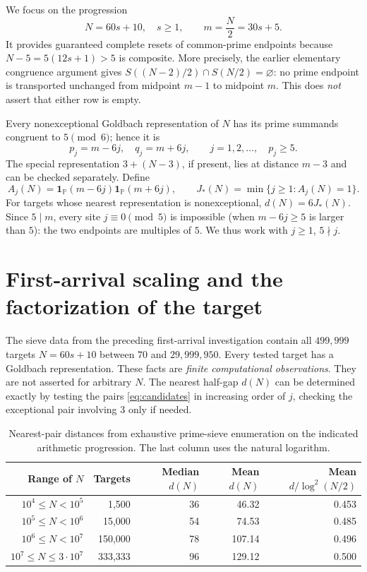 \documentclass[11pt,a4paper]{article}
\theoremstyle{definition}
\newcommand{\PP}{\mathbb P}
\newcommand{\ind}{\mathbf 1}
\begin{document}
We focus on the progression
\begin{equation}\label{eq:progression}
 N=60s+10,\quad s\ge1,\qquad m=\frac N2=30s+5.
\end{equation}
It provides guaranteed complete resets of common-prime endpoints because $N-5=5(12s+1)>5$ is composite.  More precisely, the earlier elementary congruence argument gives $S((N-2)/2)\cap S(N/2)=\varnothing$: no prime endpoint is transported unchanged from midpoint $m-1$ to midpoint $m$.  This does \emph{not} assert that either row is empty.

Every nonexceptional Goldbach representation of $N$ has its prime summands congruent to $5\pmod6$; hence it is
\begin{equation}\label{eq:candidates}
 p_j=m-6j,\quad q_j=m+6j,\qquad j=1,2,\ldots,\quad p_j\ge5.
\end{equation}
The special representation $3+(N-3)$, if present, lies at distance $m-3$ and can be checked separately.  Define
\begin{equation}\label{eq:Aj}
 A_j(N)=\ind_{\PP}(m-6j)\ind_{\PP}(m+6j),\qquad
 J_*(N)=\min\{j\ge1:A_j(N)=1\}.
\end{equation}
For targets whose nearest representation is nonexceptional, $d(N)=6J_*(N)$.  Since $5\mid m$, every site $j\equiv0\pmod5$ is impossible (when $m-6j\ge5$ is larger than $5$): the two endpoints are multiples of $5$.  We thus work with $j\ge1$, $5\nmid j$.

\section{First-arrival scaling and the factorization of the target}
The sieve data from the preceding first-arrival investigation contain all $499{,}999$ targets $N=60s+10$ between $70$ and $29{,}999{,}950$.  Every tested target has a Goldbach representation.  These facts are \emph{finite computational observations}. They are not asserted for arbitrary $N$.  The nearest half-gap $d(N)$ can be determined exactly by testing the pairs \eqref{eq:candidates} in increasing order of $j$, checking the exceptional pair involving $3$ only if needed.

\begin{table}[ht]
\centering\small
\begin{tabular}{@{}rrrrr@{}}
\toprule
Range of $N$ & Targets & Median $d(N)$ & Mean $d(N)$ & Mean $d/\log^2(N/2)$\\
\midrule
$10^4\le N<10^5$ & 1,500 & 36 & 46.32 & 0.453\\
$10^5\le N<10^6$ & 15,000 & 54 & 74.53 & 0.485\\
$10^6\le N<10^7$ & 150,000 & 78 & 107.14 & 0.496\\
$10^7\le N\le3\cdot10^7$ & 333,333 & 96 & 129.12 & 0.500\\
\bottomrule
\end{tabular}
\caption{Nearest-pair distances from exhaustive prime-sieve enumeration on the indicated arithmetic progression. The last column uses the natural logarithm.}
\label{tab:scaling}
\end{table}
\end{document}
